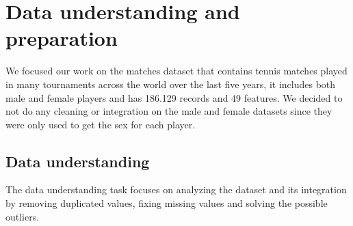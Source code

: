 \section{Data understanding and preparation}
We focused our work on the matches dataset that contains tennis matches played in many tournaments across the world over the last five years, it includes both male and female players and has 186.129 records and 49 features. We decided to not do any cleaning or integration on the male and female datasets since they were only used to get the sex for each player.

\subsection{Data understanding}
The data understanding task focuses on analyzing the dataset and its integration by removing duplicated values, fixing missing values and solving the possible outliers.
